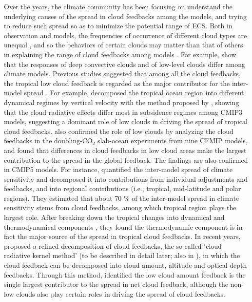 Over the years, the climate community has been focusing on understand the underlying causes of the spread in cloud feedbacks among the models, and trying to reduce such spread so as to minimize the potential range of ECS. Both in observation and models, the frequencies of occurrence of different cloud types are unequal  \citep[e.g.,][]{Zhang2005comparing}, and so the behaviors of certain clouds may matter than that of others in explaining the range of cloud feedbacks among models \citep{Bony2006}. For example, \cite{Wyant2006comparison} show that the responses of deep convective clouds and of low-level clouds differ among climate models. 
Previous studies suggested that among all the cloud feedbacks, the tropical low cloud feedback is regarded as the major contributor for the inter-model spread 
\citep[e.g.,][]{Bony2005,Webb2006contribution,Webb2013coupling,Vial2013,Zelinka2016insights}. For example, \cite{Bony2005} decomposed the tropical ocean region into different dynamical regimes by vertical velocity with the method proposed by \cite{Bony2004}, showing that the cloud radiative effects differ most in subsidence regimes among CMIP3 models, suggesting a dominant role of low clouds in driving the spread of tropical cloud feedbacks. \cite{Webb2006contribution} also confirmed the role of low clouds by analyzing the cloud feedbacks in the doubling-CO$_2$ slab-ocean experiments from nine CFMIP models, and found that differences in cloud feedbacks in low cloud areas make the largest contribution to the spread in the global feedback. The findings are also confirmed in CMIP5 models. For instance, \cite{Vial2013} quantified the inter-model spread of climate sensitivity and decomposed it into contributions from individual adjustments and feedbacks, and into regional contributions (i.e., tropical, mid-latitude and polar regions). They estimated that about 70 \% of the inter-model spread in climate sensitivity stems from cloud feedbacks, among which tropical region plays the largest role. After breaking down the tropical changes into dynamical and thermodynamical components \citep[method from][]{Bony2004}, they found the  thermodynamic component is in fact the major source of the spread in tropical cloud feedbacks. In recent years, \cite{Zelinka2012computing1,Zelinka2012computing2} proposed a refined decomposition of cloud feedbacks, the so called `cloud radiative kernel method' (to be described in detail later; also in ), in which the cloud feedback can be decomposed into cloud amount, altitude and optical depth feedbacks. Through this method, \cite{Zelinka2016insights} identified the low cloud amount feedback is the single largest contributor to the spread in net cloud feedback, although the non-low clouds also play certain roles in driving the spread of cloud feedbacks. 

